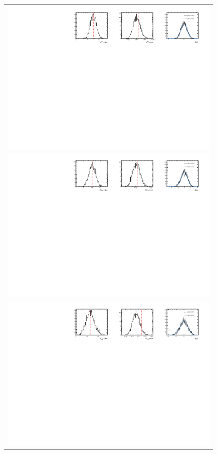 \begin{figure}
  \centering
  \begin{tabular}{c}
\includegraphics[width=\textwidth]{ANA_resources/Plots/Data_fit/FitterBias//CombinedRuns//A_signal_Kpi.pdf} \\
\includegraphics[width=\textwidth]{ANA_resources/Plots/Data_fit/FitterBias//CombinedRuns//R_signal_piK_plus.pdf} \\
\includegraphics[width=\textwidth]{ANA_resources/Plots/Data_fit/FitterBias//CombinedRuns//R_signal_piK_minus.pdf} \\

\end{tabular}
\end{figure}
